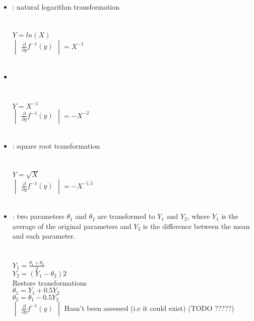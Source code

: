 \begin{itemize}
\item {} : natural logarithm transformation\\
\\
\\
$Y = ln(X)$\\
$\begin{vmatrix} \frac{\partial}{\partial y} f^{-1}(y) \end{vmatrix} = X^{-1}$\\\\

\item {}\\
\\
\\
$Y = X^{-1}$\\
$\begin{vmatrix} \frac{\partial}{\partial y} f^{-1}(y) \end{vmatrix} = -X^{-2}$\\\\

\item {} : square root transformation\\
\\
\\
$Y = \sqrt{X}$\\
$\begin{vmatrix} \frac{\partial}{\partial y} f^{-1}(y) \end{vmatrix} = -X^{-1.5}$\\\\

\item {} : two parameters $\theta_1$ and $\theta_2$ are transformed to $Y_1$ and $Y_2$, where $Y_1$ is the average of the original parameters and $Y_2$ is the difference between the mean and each parameter.\\
\\
\\
$Y_1 = \frac{\theta_1 + \theta_2}{2}$\\
$Y_2 =  (Y_1 - \theta_2)2 $\\
Restore transformations\\
$\theta_1 = Y_1 + 0.5Y_2$\\
$\theta_2 = \theta_1 - 0.5Y_2$\\
$\begin{vmatrix} \frac{\partial}{\partial y} f^{-1}(y) \end{vmatrix}$ Hasn't been assessed (i.e it could exist) (TODO ?????)\\


\end{itemize}

